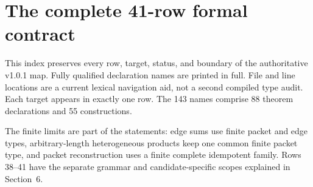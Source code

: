 

\usepackage{komorebi-publication}
\renewcommand{\KomorebiTitle}{Projector-Resolved Seed Calculus III}
\renewcommand{\KomorebiSubtitle}{Typed transfer, nonlinear packets, and obstruction theory}
\renewcommand{\KomorebiSeries}{Core series III}
\renewcommand{\KomorebiKind}{Lean and evidence guide}
\renewcommand{\KomorebiEdition}{Standardized publication edition / 8 October 2026}
\renewcommand{\KomorebiShortTitle}{Paper III}
\renewcommand{\KomorebiTitleSize}{31}
\renewcommand{\KomorebiTitleLeading}{36}
\renewcommand{\KomorebiProfile}{classical}
\renewcommand{\KomorebiOrientation}{portrait}
\KomorebiSetup

\KomorebiCover
{}


\tableofcontents
\clearpage







\clearpage
\section{The complete 41-row formal contract}\label{sec:map}
This index preserves every row, target, status, and boundary of the authoritative v1.0.1 map. Fully qualified declaration names are printed in full. File and line locations are a current lexical navigation aid, not a second compiled type audit. Each target appears in exactly one row. The 143 names comprise 88 theorem declarations and 55 constructions.

The finite limits are part of the statements: edge sums use finite packet and edge types, arbitrary-length heterogeneous products keep one common finite packet type, and packet reconstruction uses a finite complete idempotent family. Rows 38--41 have the separate grammar and candidate-specific scopes explained in Section~6.

\clearpage
\appendix

